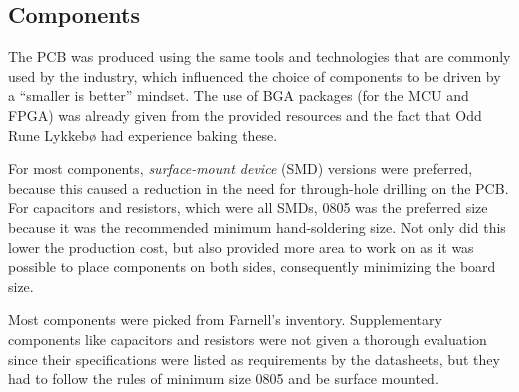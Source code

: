
\subsection{Components}

The PCB was produced using the same tools and technologies that are commonly
used by the industry, which influenced the choice of components to be driven by
a ``smaller is better'' mindset. The use of BGA packages (for the MCU and FPGA)
was already given from the provided resources and the fact that Odd Rune Lykkebø
had experience baking these.

For most components, \emph{surface-mount device} (SMD) versions were
preferred, because this caused a reduction in the need for through-hole drilling
on the PCB. For capacitors and resistors, which were all SMDs, 0805 was the preferred size because it
was the recommended minimum hand-soldering size. Not only did this lower the
production cost, but also provided more area to work on as it was possible to
place components on both sides, consequently minimizing the board size.

Most components were picked from Farnell's inventory. Supplementary components
like capacitors and resistors were not given a thorough evaluation since their
specifications were listed as requirements by the datasheets, but they had to
follow the rules of minimum size 0805 and be surface mounted.








